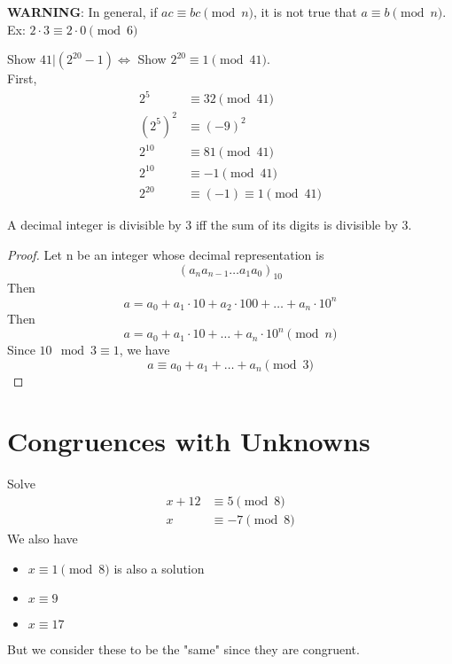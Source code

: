     \textbf{WARNING}: In general, if $ac\equiv bc\pmod{n}$, it is not true that 
    $a\equiv b\pmod{n}$. 
    Ex: $2\cdot 3\equiv 2\cdot 0\pmod{6}$

    \begin{example}
        Show $41|(2^{20}-1) \Leftrightarrow$ Show $2^{20}\equiv 1 \pmod{41}$. \\
        First, 
        \begin{align*}
            2^5 & \equiv 32 \pmod{41} \\
            (2^5)^2 & \equiv (-9)^2 \\
            2^{10} & \equiv 81 \pmod{41} \\
            2^{10} & \equiv -1 \pmod{41} \\
            2^{20} & \equiv (-1) \equiv 1 \pmod{41} 
        \end{align*}
    \end{example}

    \begin{proposition}
        A decimal integer is divisible by 3 iff the sum of its digits is 
        divisible by 3.
        \begin{proof}
            Let n be an integer whose decimal representation is 
            \[ (a_na_{n-1}\dots a_1a_0)_{10} \]
            Then 
            \[ a=a_0+a_1\cdot 10+a_2\cdot 100+\dots+a_n\cdot 10^n \]
            Then
            \[ a=a_0+a_1\cdot 10+\dots+a_n\cdot 10^n \pmod{n}\]
            Since $10\mod 3\equiv 1$, we have
            \[ a\equiv a_0+a_1+\dots+a_n\pmod{3} \]
        \end{proof}
    \end{proposition}

\section{Congruences with Unknowns}
    \begin{example}
        Solve
        \begin{align*}
            x+12 &\equiv 5\pmod{8} \\
            x &\equiv -7\pmod{8}
        \end{align*}
        We also have
        \begin{itemize}
            \item $x\equiv 1\pmod{8}$ is also a solution
            \item $x\equiv 9$
            \item $x\equiv 17$
        \end{itemize}
        But we consider these to be the "same" since they are congruent.
    \end{example}

